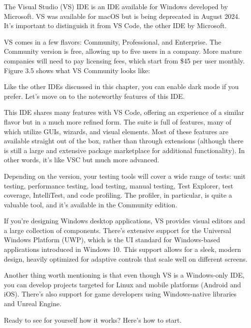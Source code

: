 
The Visual Studio (VS) IDE is an IDE available for Windows developed by Microsoft. VS was available for macOS but is being deprecated in August 2024. It’s important to distinguish it from VS Code, the other IDE by Microsoft.

VS comes in a few flavors: Community, Professional, and Enterprise. The Community version is free, allowing up to five users in a company. More mature companies will need to pay licensing fees, which start from \$45 per user monthly. Figure 3.5 shows what VS Community looks like:


Like the other IDEs discussed in this chapter, you can enable dark mode if you prefer. Let’s move on to the noteworthy features of this IDE.


This IDE shares many features with VS Code, offering an experience of a similar flavor but in a much more refined form. The suite is full of features, many of which utilize GUIs, wizards, and visual elements. Most of these features are available straight out of the box, rather than through extensions (although there is still a large and extensive package marketplace for additional functionality). In other words, it’s like VSC but much more advanced.

Depending on the version, your testing tools will cover a wide range of tests: unit testing, performance testing, load testing, manual testing, Test Explorer, test coverage, IntelliTest, and code profiling. The profiler, in particular, is quite a valuable tool, and it’s available in the Community edition.

If you’re designing Windows desktop applications, VS provides visual editors and a large collection of components. There’s extensive support for the Universal Windows Platform (UWP), which is the UI standard for Windows-based applications introduced in Windows 10. This support allows for a sleek, modern design, heavily optimized for adaptive controls that scale well on different screens.

Another thing worth mentioning is that even though VS is a Windows-only IDE, you can develop projects targeted for Linux and mobile platforms (Android and iOS). There’s also support for game developers using Windows-native libraries and Unreal Engine.

Ready to see for yourself how it works? Here’s how to start.

